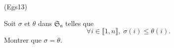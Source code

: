 \begin{tiny}(Egs13)\end{tiny} Soit $\sigma$ et $\theta$ dans $\mathfrak{S_n}$ telles que
\[
 \forall i \in \llbracket 1,n \rrbracket, \; \sigma(i) \leq \theta(i).
\]
Montrer que $\sigma = \theta$.